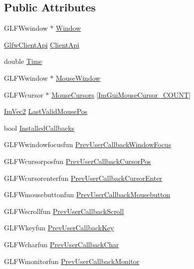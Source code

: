 \subsection*{Public Attributes}
\begin{DoxyCompactItemize}
\item 
G\+L\+F\+Wwindow $\ast$ \hyperlink{structImGui__ImplGlfw__Data_aad8ecdab1cb486c427254f2032214da7}{Window}
\item 
\hyperlink{imgui__impl__glfw_8cpp_abfd5392e93ee3c4e7f86cc5515e2d413}{Glfw\+Client\+Api} \hyperlink{structImGui__ImplGlfw__Data_a089d00194b9c811ee8da7a4976ea6ab9}{Client\+Api}
\item 
double \hyperlink{structImGui__ImplGlfw__Data_a63f538471c9e5113975333df9494d526}{Time}
\item 
G\+L\+F\+Wwindow $\ast$ \hyperlink{structImGui__ImplGlfw__Data_a0cd83054e5f18b548ad7030e56e44fa7}{Mouse\+Window}
\item 
G\+L\+F\+Wcursor $\ast$ \hyperlink{structImGui__ImplGlfw__Data_ad7072d22c235f2e6d53e1a5a0e54cc0c}{Mouse\+Cursors} \mbox{[}\hyperlink{imgui_8h_a2eb1181cc1d7872a061df8731141dde9a4c24ccc8f37a57d6341da1cfd3b337a5}{Im\+Gui\+Mouse\+Cursor\+\_\+\+C\+O\+U\+NT}\mbox{]}
\item 
\hyperlink{structImVec2}{Im\+Vec2} \hyperlink{structImGui__ImplGlfw__Data_a71c8194d82a00e458884c50552e21933}{Last\+Valid\+Mouse\+Pos}
\item 
bool \hyperlink{structImGui__ImplGlfw__Data_a2cd25c9a1afd831a20c9ec5a6dc52b91}{Installed\+Callbacks}
\item 
G\+L\+F\+Wwindowfocusfun \hyperlink{structImGui__ImplGlfw__Data_ab2d6f0997eee54b310ab657e48b50033}{Prev\+User\+Callback\+Window\+Focus}
\item 
G\+L\+F\+Wcursorposfun \hyperlink{structImGui__ImplGlfw__Data_a58577fb2f4a4f9657802712f728e5d17}{Prev\+User\+Callback\+Cursor\+Pos}
\item 
G\+L\+F\+Wcursorenterfun \hyperlink{structImGui__ImplGlfw__Data_a0bb12cf6a91ce6e42900a5c1fb58369e}{Prev\+User\+Callback\+Cursor\+Enter}
\item 
G\+L\+F\+Wmousebuttonfun \hyperlink{structImGui__ImplGlfw__Data_a4f072029ab315c801b69849648bd5e86}{Prev\+User\+Callback\+Mousebutton}
\item 
G\+L\+F\+Wscrollfun \hyperlink{structImGui__ImplGlfw__Data_a37a806957eff842793b1010bf55b3a49}{Prev\+User\+Callback\+Scroll}
\item 
G\+L\+F\+Wkeyfun \hyperlink{structImGui__ImplGlfw__Data_a61c7fb5bae79f2296c361912ef0c7179}{Prev\+User\+Callback\+Key}
\item 
G\+L\+F\+Wcharfun \hyperlink{structImGui__ImplGlfw__Data_a537697690bd14a0a11be72f3ef874793}{Prev\+User\+Callback\+Char}
\item 
G\+L\+F\+Wmonitorfun \hyperlink{structImGui__ImplGlfw__Data_a874ea29cb2f17f07255a738b9eda8118}{Prev\+User\+Callback\+Monitor}
\end{DoxyCompactItemize}


